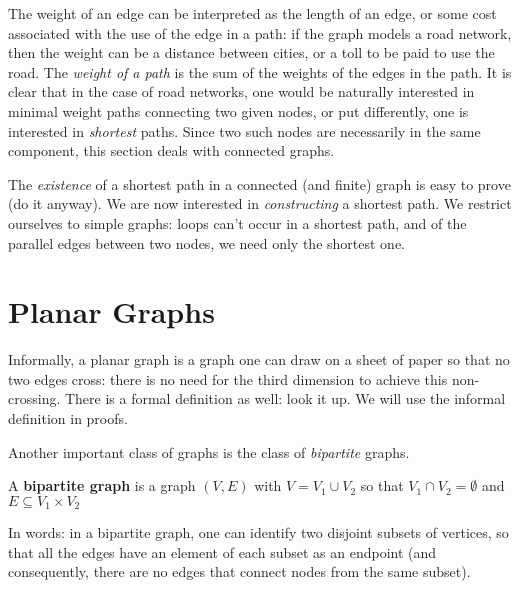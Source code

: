 The weight of an edge can be interpreted as the length of an
edge, or some cost associated with the use of the edge in a path: if
the graph models a road network, then the weight can be a distance
between cities, or a toll to be paid to use the road. The {\em weight
of a path} is the sum of the weights of the edges in the path. It is
clear that in the case of road networks, one would be naturally
interested in minimal weight paths connecting two given nodes, or put
differently, one is interested in {\em shortest} paths. Since two such
nodes are necessarily in the same component, this section deals with
connected graphs.

The {\em existence} of a shortest path in a connected (and finite)
graph is easy to prove (do it anyway). We are now interested in {\em
constructing} a shortest path. We restrict ourselves to simple graphs:
loops can't occur in a shortest path, and of the parallel edges
between two nodes, we need only the shortest one.



\section{Planar Graphs}

Informally, a planar graph is a graph one can draw on a sheet of
paper so that no two edges cross: there is no need for the third
dimension to achieve this non-crossing. There is a formal definition
as well: look it up. We will use the informal definition in proofs.

Another important class of graphs is the class of {\em bipartite}
graphs.

 \begin{definition}
  \textup{A \textbf{bipartite graph} is a graph $(V,E)$ with $V =
V_{1} \cup V_{2}$ so that $V_{1} \cap V_{2} = \emptyset$ and $E
\subseteq V_{1} \times V_{2}$ }
\end{definition}

In words: in a bipartite graph, one can identify two disjoint subsets
of vertices, so that all the edges have an element of each subset as
an endpoint (and consequently, there are no edges that connect nodes
from the same subset).


